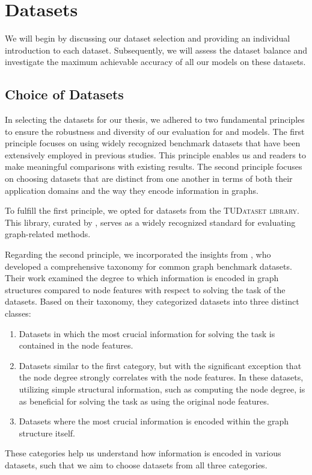\section{Datasets}\label{sec:datasets}
We will begin by discussing our dataset selection and providing an individual introduction to each dataset. Subsequently, we will assess the dataset balance and investigate the maximum achievable accuracy of all our models on these datasets.

\subsection{Choice of Datasets}
In selecting the datasets for our thesis, we adhered to two fundamental principles to ensure the robustness and diversity of our evaluation for \gnn and \wlnn models. The first principle focuses on using widely recognized benchmark datasets that have been extensively employed in previous studies. This principle enables us and readers to make meaningful comparisons with existing results. The second principle focuses on choosing datasets that are distinct from one another in terms of both their application domains and the way they encode information in graphs.

To fulfill the first principle, we opted for datasets from the \textsc{TUDataset library}. This library, curated by \cite{Mor+2020}, serves as a widely recognized standard for evaluating graph-related methods.

Regarding the second principle, we incorporated the insights from \cite{Liu2022}, who developed a comprehensive taxonomy for common graph benchmark datasets. Their work examined the degree to which information is encoded in graph structures compared to node features with respect to solving the task of the datasets. Based on their taxonomy, they categorized datasets into three distinct classes:
\begin{enumerate}[label={Category \arabic*:},leftmargin=*]
	\item Datasets in which the most crucial information for solving the task is contained in the node features.
	\item Datasets similar to the first category, but with the significant exception that the node degree strongly correlates with the node features. In these datasets, utilizing simple structural information, such as computing the node degree, is as beneficial for solving the task as using the original node features.
	\item Datasets where the most crucial information is encoded within the graph structure itself.
\end{enumerate}
These categories help us understand how information is encoded in various datasets, such that we aim to choose datasets from all three categories.

